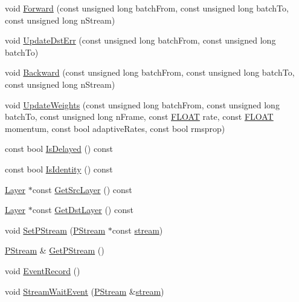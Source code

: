 \begin{DoxyCompactItemize}
\item 
void \hyperlink{classfractal_1_1Connection_af95b3556c57e92edb06a4d33364dc0c2}{Forward} (const unsigned long batch\+From, const unsigned long batch\+To, const unsigned long n\+Stream)
\item 
void \hyperlink{classfractal_1_1Connection_af4754297e3aa7fcf27d68e7fc034d069}{Update\+Dst\+Err} (const unsigned long batch\+From, const unsigned long batch\+To)
\item 
void \hyperlink{classfractal_1_1Connection_a983f5ebf6c8072f950a0ca3c0bfdb6f1}{Backward} (const unsigned long batch\+From, const unsigned long batch\+To, const unsigned long n\+Stream)
\item 
void \hyperlink{classfractal_1_1Connection_a2b8a12fcdb97fe575d48348ac3e42daa}{Update\+Weights} (const unsigned long batch\+From, const unsigned long batch\+To, const unsigned long n\+Frame, const \hyperlink{namespacefractal_a1c2d2530689575d5ccb56bae52af70d3}{F\+L\+O\+A\+T} rate, const \hyperlink{namespacefractal_a1c2d2530689575d5ccb56bae52af70d3}{F\+L\+O\+A\+T} momentum, const bool adaptive\+Rates, const bool rmsprop)
\item 
const bool \hyperlink{classfractal_1_1Connection_a55a98b43749d2af37c492046bdabae30}{Is\+Delayed} () const 
\item 
const bool \hyperlink{classfractal_1_1Connection_a88b1bd4a69a9c1533ce0d2b261ad0825}{Is\+Identity} () const 
\item 
\hyperlink{classfractal_1_1Layer}{Layer} $\ast$const \hyperlink{classfractal_1_1Connection_a7ee554da75a227b017217121e9c0d70e}{Get\+Src\+Layer} () const 
\item 
\hyperlink{classfractal_1_1Layer}{Layer} $\ast$const \hyperlink{classfractal_1_1Connection_afeb565eb5cf7f0a86d78fb0b111eebc8}{Get\+Dst\+Layer} () const 
\item 
void \hyperlink{classfractal_1_1Connection_adf2811ab3189c8e4733b157486b26eb6}{Set\+P\+Stream} (\hyperlink{classfractal_1_1PStream}{P\+Stream} $\ast$const \hyperlink{classfractal_1_1Connection_afd1476955597e7a1fddb196fec69af82}{stream})
\item 
\hyperlink{classfractal_1_1PStream}{P\+Stream} \& \hyperlink{classfractal_1_1Connection_ad8d0ba5c34c518c24f3104448c5b0d6f}{Get\+P\+Stream} ()
\item 
void \hyperlink{classfractal_1_1Connection_a54577602a6deab30026078ce5a44f5cd}{Event\+Record} ()
\item 
void \hyperlink{classfractal_1_1Connection_a74c50d78f6c779d0a82a58f097fca3ef}{Stream\+Wait\+Event} (\hyperlink{classfractal_1_1PStream}{P\+Stream} \&\hyperlink{classfractal_1_1Connection_afd1476955597e7a1fddb196fec69af82}{stream})

\end{DoxyCompactItemize}
